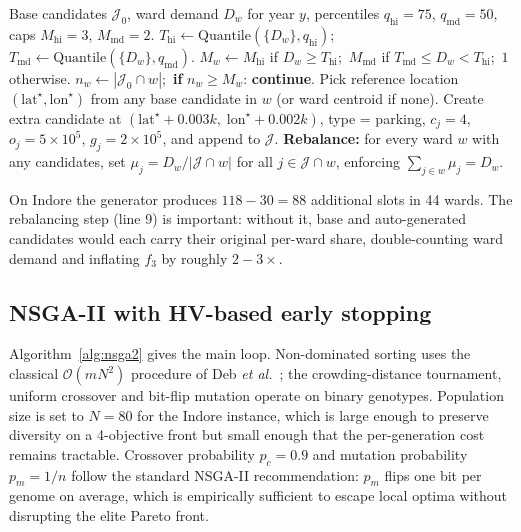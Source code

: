 \documentclass[conference]{IEEEtran}
\begin{document}
\begin{algorithm}[t]
\caption{Dynamic candidate generation}
\label{alg:dyncand}
\begin{algorithmic}[1]
  \REQUIRE Base candidates $\mathcal{J}_{0}$, ward demand $D_{w}$ for
           year $y$, percentiles $q_{\text{hi}}{=}75$, $q_{\text{md}}{=}50$,
           caps $M_{\text{hi}}{=}3$, $M_{\text{md}}{=}2$.
  \STATE $T_{\text{hi}}\gets\text{Quantile}(\{D_{w}\},q_{\text{hi}})$;\
         $T_{\text{md}}\gets\text{Quantile}(\{D_{w}\},q_{\text{md}})$.
  \FOR{each ward $w$}
    \STATE $M_{w}\gets M_{\text{hi}}$ if $D_{w}\!\ge\!T_{\text{hi}}$;\
           $M_{\text{md}}$ if $T_{\text{md}}\!\le\!D_{w}\!<\!T_{\text{hi}}$;\
           $1$ otherwise.
    \STATE $n_{w}\gets|\mathcal{J}_{0}\cap w|$;\
           \textbf{if} $n_{w}\!\ge\!M_{w}$: \textbf{continue}.
    \STATE Pick reference location $(\text{lat}^{\star},\text{lon}^{\star})$ from any
           base candidate in $w$ (or ward centroid if none).
    \FOR{$k\gets 1$ \TO $M_{w}-n_{w}$}
      \STATE Create extra candidate at
             $(\text{lat}^{\star}\!+\!0.003k,\;\text{lon}^{\star}\!+\!0.002k)$,
             type = parking, $c_{j}{=}4$,
             $o_{j}{=}5{\times}10^{5}$, $g_{j}{=}2{\times}10^{5}$,
             and append to $\mathcal{J}$.
    \ENDFOR
  \ENDFOR
  \STATE \textbf{Rebalance:} for every ward $w$ with any candidates,
         set $\mu_{j}\!=\!D_{w}/|\mathcal{J}\cap w|$ for all
         $j\!\in\!\mathcal{J}\cap w$, enforcing
         $\sum_{j\in w}\mu_{j}\!=\!D_{w}$.
\end{algorithmic}
\end{algorithm}
On Indore the generator produces $118\!-\!30\!=\!88$ additional slots in
44 wards. The rebalancing step (line 9) is important: without it, base
and auto-generated candidates would each carry their original per-ward
share, double-counting ward demand and inflating $f_{3}$ by roughly
$2\!-\!3\times$.

\subsection{NSGA-II with HV-based early stopping}
\label{subsec:nsga2}
Algorithm~\ref{alg:nsga2} gives the main loop. Non-dominated sorting
uses the classical $\mathcal{O}(m N^{2})$ procedure of Deb
\emph{et al.}~\cite{ref_nsga2}; the crowding-distance tournament,
uniform crossover and bit-flip mutation operate on binary
genotypes. Population size is set to $N{=}80$ for the Indore
instance, which is large enough to preserve diversity on a
4-objective front but small enough that the per-generation cost
remains tractable. Crossover probability $p_{c}{=}0.9$ and mutation
probability $p_{m}{=}1/n$ follow the standard NSGA-II
recommendation: $p_{m}$ flips one bit per genome on average, which
is empirically sufficient to escape local optima without disrupting
the elite Pareto front.
\end{document}
